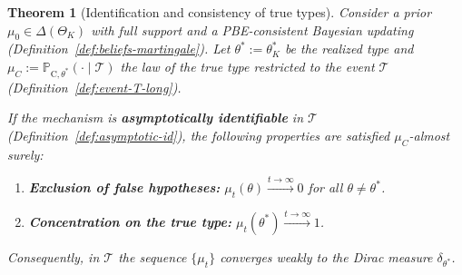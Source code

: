 \documentclass[12pt]{article}
\numberwithin{equation}{section}
\numberwithin{table}{section}
\newtheorem{theorem}{Theorem}[section]
\theoremstyle{definition}
\newcommand{\ProbC}[1]{\mathbb{P}_{\mathrm{C},#1}}
\begin{document}
\begin{theorem}[Identification and consistency of true types]
\label{thm:posterior-consistency}
Consider a prior $\mu_0\in\Delta(\Theta_K)$ with full support and a
PBE-consistent Bayesian updating
(Definition~\ref{def:beliefs-martingale}). Let $\theta^\ast:=\theta_K^\ast$ be the
realized type and $\mu_C:=\ProbC{\theta^\ast}(\cdot\mid\mathcal{T})$ the law
of the true type restricted to the event $\mathcal{T}$
(Definition~\ref{def:event-T-long}).

If the mechanism is \textbf{asymptotically identifiable} in $\mathcal{T}$
(Definition~\ref{def:asymptotic-id}), the following properties are satisfied
$\mu_C$-almost surely:
\begin{enumerate}
  \item \textbf{Exclusion of false hypotheses:}
  $\mu_t(\theta)\xrightarrow{t\to\infty}0$ for all $\theta\neq\theta^\ast$.
  \item \textbf{Concentration on the true type:}
  $\mu_t(\theta^\ast)\xrightarrow{t\to\infty}1$.
\end{enumerate}
Consequently, in $\mathcal{T}$ the sequence $\{\mu_t\}$ converges weakly
to the Dirac measure $\delta_{\theta^\ast}$.
\end{theorem}
\end{document}
